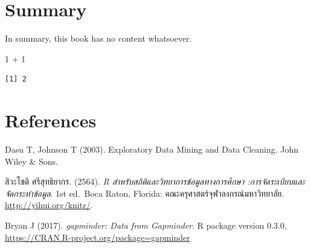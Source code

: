 \documentclass[
  letterpaper,
  DIV=11,
  numbers=noendperiod]{scrreprt}
\newenvironment{Shaded}{\begin{snugshade}}{\end{snugshade}}
\newcommand{\DecValTok}[1]{\textcolor[rgb]{0.68,0.00,0.00}{#1}}
\newcommand{\SpecialCharTok}[1]{\textcolor[rgb]{0.37,0.37,0.37}{#1}}
\newlength{\cslhangindent}
\newlength{\cslentryspacingunit} %
\newenvironment{CSLReferences}[2] %
 {%
  \setlength{\parindent}{0pt}
  \ifodd #1
  \let\oldpar\par
  \def\par{\hangindent=\cslhangindent\oldpar}
  \fi
  \setlength{\parskip}{#2\cslentryspacingunit}
 }%
 {}
\begin{document}

\hypertarget{summary}{%
\chapter{Summary}\label{summary}}

In summary, this book has no content whatsoever.

\begin{Shaded}
\begin{Highlighting}[]
\DecValTok{1} \SpecialCharTok{+} \DecValTok{1}
\end{Highlighting}
\end{Shaded}

\begin{verbatim}
[1] 2
\end{verbatim}


\hypertarget{references}{%
\chapter*{References}\label{references}}

\hypertarget{refs}{}
\begin{CSLReferences}{0}{0}
\end{CSLReferences}

Dasu T, Johnson T (2003). Exploratory Data Mining and Data Cleaning.
John Wiley \& Sons.

สิวะโชติ ศรีสุทธิยากร. (2564). \emph{R สำหรับสถิติและวิทยาการข้อมูลทางการศึกษา
:การจัดระเบียบและจัดกระทำข้อมูล}. 1st ed.~Boca Raton, Florida:
คณะครุศาสตร์จุฬาลงกรณ์มหาวิทยาลัย. \url{http://yihui.org/knitr/}.

Bryan J (2017). \emph{gapminder: Data from Gapminder}. R package version
0.3.0, \url{https://CRAN.R-project.org/package=gapminder}
\end{document}

